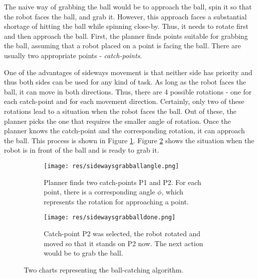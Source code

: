 The naive way of grabbing the ball would be to approach the ball, spin it so
that the robot faces the ball, and grab it. However, this approach faces a
substantial shortage of hitting the ball while spinning close-by. Thus, it
needs to rotate first and then approach the ball. First, the planner finds
points suitable for grabbing the ball, assuming that a robot placed on a point
is facing the ball. There are usually two appropriate points -
\emph{catch-points}. 


One of the advantages of sideways movement is that neither side has priority
and thus both sides can be used for any kind of task. As long as the robot
faces the ball, it can move in both directions. Thus, there are 4 possible
rotations - one for each catch-point and for each movement direction.
Certainly, only two of these rotations lead to a situation when the robot faces
the ball. Out of these, the planner picks the one that requires the smaller
angle of rotation. Once the planner knows the catch-point and the corresponding
rotation, it can approach the ball. This process is shown in Figure
\ref{fig:sidewaysgrabballangle}. Figure \ref{fig:sidewaysgrabballdone} shows
the situation when the robot is in front of the ball and is ready to grab it.


\begin{figure}[H]
	\begin{center}
	\begin{subfigure}{0.5\textwidth}
  		\texttt{[image: res/sidewaysgrabballangle.png]}
  		\caption{Planner finds two catch-points P1 and P2. For each point, there is a corresponding angle $\phi$, which represents the rotation for approaching a point.}
  		\label{fig:sidewaysgrabballangle}
	\end{subfigure}%
	\begin{subfigure}{0.5\textwidth}
  		\texttt{[image: res/sidewaysgrabballdone.png]}
  		\caption{Catch-point P2 was selected, the robot rotated and moved so that it stands on P2 now. The next action would be to grab the ball. }
  		\label{fig:sidewaysgrabballdone}
	\end{subfigure}%
	
	\caption{Two charts representing the ball-catching algorithm. }
	\label{fig:sidewaysgrabball}
	\end{center}
\end{figure}


